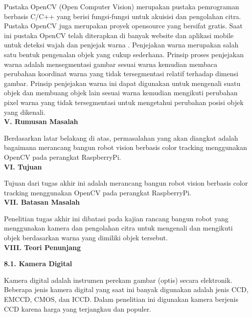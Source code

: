 \documentclass[a4paper,12pt]{article}
\begin{document}
Pustaka OpenCV (Open Computer Vision) merupakan pustaka pemrograman berbasis C/C++ yang berisi fungsi-fungsi untuk akuisisi dan pengolahan citra.
Pustaka OpenCV juga merupakan proyek opensource yang bersifat gratis.
Saat ini pustaka OpenCV telah diterapkan di banyak website dan aplikasi mobile untuk deteksi wajah dan penjejak warna \cite{opencv_intro}.
Penjejakan warna merupakan salah satu bentuk pengenalan objek yang cukup sederhana. 
Prinsip proses penjejakan warna adalah mensegmentasi gambar sesuai warna kemudian membaca perubahan koordinat warna yang tidak tersegmentasi relatif terhadap dimensi gambar.
Prinsip penjejakan warna ini dapat digunakan untuk mengenali suatu objek dan membuang objek lain sesuai warna kemudian mengikuti perubahan pixel warna yang tidak tersegmentasi untuk mengetahui perubahan posisi objek yang dikenali.
\\[10pt]
\noindent \textbf{V. \hspace{10pt} Rumusan Masalah}

Berdasarkan latar belakang di atas, permasalahan yang akan diangkat adalah bagaimana merancang bangun robot vision berbasis color tracking menggunakan OpenCV pada perangkat RaspberryPi.
\\[10pt]
\noindent \textbf{VI. \hspace{9pt} Tujuan}

Tujuan dari tugas akhir ini adalah merancang bangun robot vision berbasis color tracking menggunakan OpenCV pada perangkat RaspberryPi.
\\[10pt]
\noindent \textbf{VII. \hspace{8pt} Batasan Masalah}

Penelitian tugas akhir ini dibatasi pada kajian rancang bangun robot yang menggunakan kamera dan pengolahan citra untuk mengenali dan mengikuti objek berdasarkan warna yang dimiliki objek tersebut.
\\[10pt]
\noindent \textbf{VIII. \hspace{7pt} Teori Penunjang}

\indent \textbf{8.1. \hspace{8pt} Kamera Digital}

Kamera digital adalah instrumen perekam gambar (optis) secara elektronik.
Beberapa jenis kamera digital yang saat ini banyak digunakan adalah jenis CCD, EMCCD, CMOS, dan ICCD.
Dalam penelitian ini digunakan kamera berjenis CCD karena harga yang terjangkau dan populer.
\end{document}
